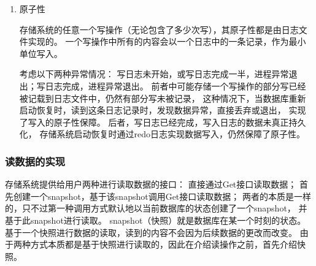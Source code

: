 \begin{enumerate}
		\item 原子性
		
		存储系统的任意一个写操作（无论包含了多少次写），其原子性都是由日志文件实现的。
		一个写操作中所有的内容会以一个日志中的一条记录，作为最小单位写入。

		考虑以下两种异常情况：
		写日志未开始，或写日志完成一半，进程异常退出；写日志完成，进程异常退出。
		前者中可能存储一个写操作的部分写已经被记载到日志文件中，仍然有部分写未被记录，
		这种情况下，当数据库重新启动恢复时，读到这条日志记录时，发现数据异常，直接丢弃或退出，
		实现了写入的原子性保障。
		后者，写日志已经完成，写入日志的数据未真正持久化，
		存储系统启动恢复时通过redo日志实现数据写入，仍然保障了原子性。

		\end{enumerate}


		\subsubsection{读数据的实现}

	存储系统提供给用户两种进行读取数据的接口：
	直接通过Get接口读取数据；
	首先创建一个snapshot，基于该snapshot调用Get接口读取数据；
	两者的本质是一样的，只不过第一种调用方式默认地以当前数据库的状态创建了一个snapshot，
	并基于此snapshot进行读取。
	snapshot（快照）就是数据库在某一个时刻的状态。
	基于一个快照进行数据的读取，读到的内容不会因为后续数据的更改而改变。
	由于两种方式本质都是基于快照进行读取的，因此在介绍读操作之前，首先介绍快照。

